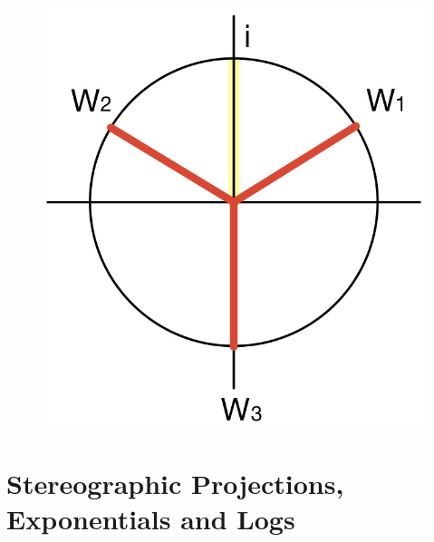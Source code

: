 \documentclass[11pt]{article}
\begin{document}
\begin{figure}[H]
\includegraphics[scale = 0.2]{2_5}
\centering
\end{figure}

\newpage
\section{Stereographic Projections, Exponentials and Logs}
\end{document}
